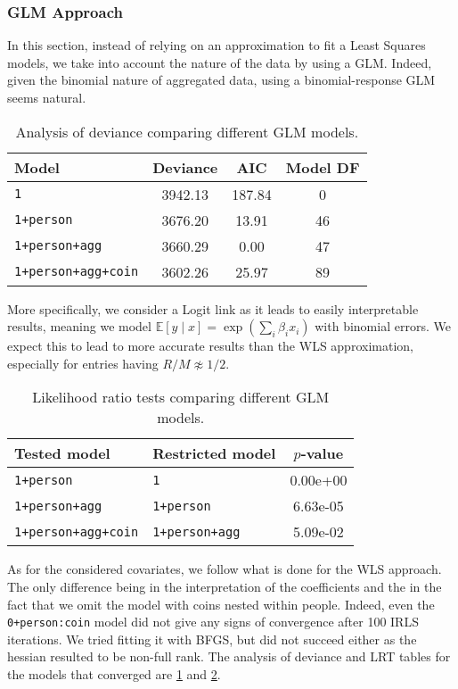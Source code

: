 \documentclass[a4paper, 12pt,oneside]{article}
\begin{document}
			\subsubsection{GLM Approach}
			In this section, instead of relying on an approximation to fit a Least Squares models, we take into account the nature of the data by using a GLM. Indeed, given the binomial nature of aggregated data, using a binomial-response GLM seems natural. 
			\begin{table}[htb]
				\centering
				\caption{Analysis of deviance comparing different GLM models.}
				\label{tab:glm-model-comparison}
				\begin{tabular}{lccc}
				\toprule
				Model & Deviance & AIC & Model DF \\
				\midrule
				\texttt{1} & 3942.13 & 187.84 & 0 \\
				\texttt{1+person} & 3676.20 & 13.91 & 46 \\
				\texttt{1+person+agg} & 3660.29 & 0.00 & 47 \\
				\texttt{1+person+agg+coin} & 3602.26 & 25.97 & 89 \\
				\bottomrule
				\end{tabular}
			\end{table}
			More specifically, we consider a Logit link as it leads to easily interpretable results, meaning we model $\mathbb{E}[y\mid x]=\exp\left(\sum_i \beta_i x_i\right)$ with binomial errors. We expect this to lead to more accurate results than the WLS approximation, especially for entries having $R/M\not\approx 1/2$.
			\begin{table}[htb]
				\centering
				\caption{Likelihood ratio tests comparing different GLM models.}
				\label{tab:glm-lrt-comparison}
				\begin{tabular}{llc}
				\toprule
				Tested model & Restricted model & $p$-value \\
				\midrule
				\texttt{1+person} & \texttt{1} & 0.00e+00 \\
				\texttt{1+person+agg} & \texttt{1+person} & 6.63e-05 \\
				\texttt{1+person+agg+coin} & \texttt{1+person+agg} & 5.09e-02 \\
				\bottomrule
				\end{tabular}
			\end{table}
			As for the considered covariates, we follow what is done for the WLS approach. The only difference being in the interpretation of the coefficients and the in the fact that we omit the model with coins nested within people. Indeed, even the \texttt{0+person:coin} model did not give any signs of convergence after 100 IRLS iterations. We tried fitting it with BFGS, but did not succeed either as the hessian resulted to be non-full rank. The analysis of deviance and LRT tables for the models that converged are \ref{tab:glm-model-comparison} and \ref{tab:glm-lrt-comparison}.
\end{document}
